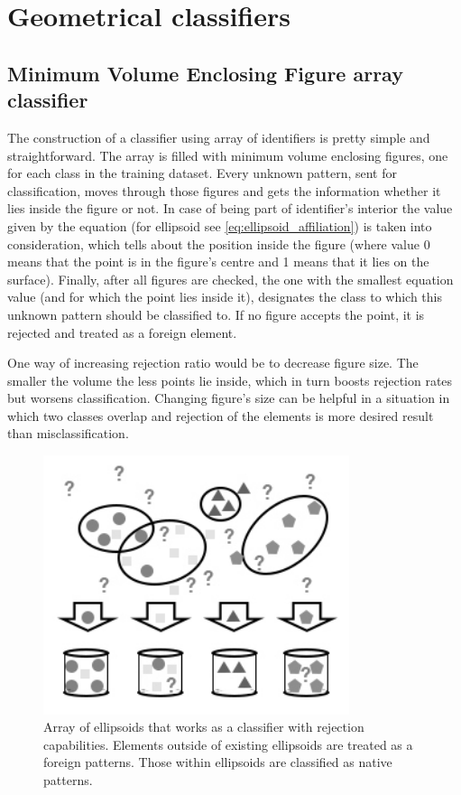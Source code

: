 \section{Geometrical classifiers}

\subsection{Minimum Volume Enclosing Figure array classifier}

The construction of a classifier using array of identifiers is pretty simple and straightforward. The array is filled with minimum volume enclosing figures, one for each class in the training dataset. Every unknown pattern, sent for classification, moves through those figures and gets the information whether it lies inside the figure or not. In case of being part of identifier's interior the value given by the equation (for ellipsoid see \ref{eq:ellipsoid_affiliation}) is taken into consideration, which tells about the position inside the figure (where value 0 means that the point is in the figure's centre and 1 means that it lies on the surface). Finally, after all figures are checked, the one with the smallest equation value (and for which the point lies inside it), designates the class to which this unknown pattern should be classified to. If no figure accepts the point, it is rejected and treated as a foreign element. 

One way of increasing rejection ratio would be to decrease figure size. The smaller the volume the less points lie inside, which in turn boosts rejection rates but worsens classification. Changing figure's size can be helpful in a situation in which two classes overlap and rejection of the elements is more desired result than misclassification.

\begin{figure}[htp]
	\centering
	\includegraphics[width=0.8\textwidth]{Figures/ellipsoid_classification.jpg}
	\caption{ Array of ellipsoids that works as a classifier with rejection capabilities. Elements outside of existing ellipsoids are treated as a foreign patterns. Those within ellipsoids are classified as native patterns. }
	\label{fig:ellipsoids_array}\vspace{-3pt}
\end{figure}

